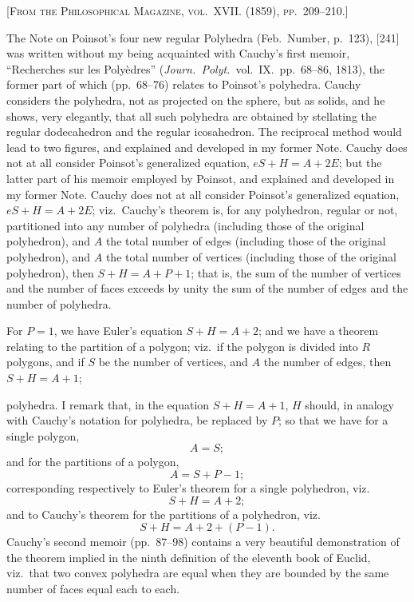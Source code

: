 \documentclass[11pt,a4paper]{article}
\begin{document}
\textsc{[From the Philosophical Magazine, vol.~XVII. (1859), pp.~209--210.]}

\setcounter{page}{86}

The Note on Poinsot's four new regular Polyhedra (Feb.\ Number, p.~123), [241] was written without my being acquainted with Cauchy's first memoir, ``Recherches sur les Polyèdres'' (\textit{Journ.\ Polyt.}\ vol.~IX.\ pp.~68--86, 1813), the former part of which (pp.~68--76) relates to Poinsot's polyhedra. Cauchy considers the polyhedra, not as projected on the sphere, but as solids, and he shows, very elegantly, that all such polyhedra are obtained by stellating the regular dodecahedron and the regular icosahedron. The reciprocal method would lead to two figures, and explained and developed in my former Note. Cauchy does not at all consider Poinsot's generalized equation, $eS + H = A + 2E$; but the latter part of his memoir employed by Poinsot, and explained and developed in my former Note. Cauchy does not at all consider Poinsot's generalized equation, $eS + H = A + 2E$; viz.\ Cauchy's theorem is, for any polyhedron, regular or not, partitioned into any number of polyhedra (including those of the original polyhedron), and $A$ the total number of edges (including those of the original polyhedron), and $A$ the total number of vertices (including those of the original polyhedron), then $S + H = A + P + 1$; that is, the sum of the number of vertices and the number of faces exceeds by unity the sum of the number of edges and the number of polyhedra.

For $P=1$, we have Euler's equation $S + H = A + 2$; and we have a theorem relating to the partition of a polygon; viz.\ if the polygon is divided into $R$ polygons, and if $S$ be the number of vertices, and $A$ the number of edges, then $S + H = A + 1$;

\setcounter{page}{87}

polyhedra. I remark that, in the equation $S + H = A + 1$, $H$ should, in analogy with Cauchy's notation for polyhedra, be replaced by $P$; so that we have for a single polygon,
\[
A = S;
\]
and for the partitions of a polygon,
\[
A = S + P - 1;
\]
corresponding respectively to Euler's theorem for a single polyhedron, viz.
\[
S + H = A + 2;
\]
and to Cauchy's theorem for the partitions of a polyhedron, viz.
\[
S + H = A + 2 + (P - 1).
\]
Cauchy's second memoir (pp.~87--98) contains a very beautiful demonstration of the theorem implied in the ninth definition of the eleventh book of Euclid, viz.\ that two convex polyhedra are equal when they are bounded by the same number of faces equal each to each.
\end{document}
